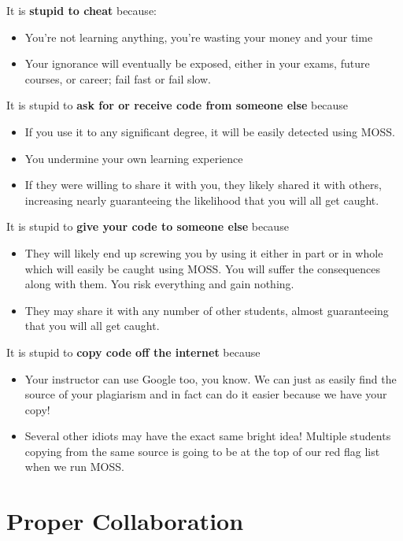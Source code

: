\documentclass[12pt]{scrartcl}
\begin{document}
It is \textbf{stupid to cheat} because:
\begin{itemize}
  \item You're not learning anything, you're wasting your money and your time
  \item Your ignorance will eventually be exposed, either in your exams, future courses, or career; fail fast or fail slow.
\end{itemize}

It is stupid to \textbf{ask for or receive code from someone else} because
\begin{itemize}
  \item If you use it to any significant degree, it will be easily detected using MOSS.
  \item You undermine your own learning experience
  \item If they were willing to share it with you, they likely shared it with others, increasing nearly guaranteeing the likelihood that you will all get caught.
\end{itemize}

It is stupid to \textbf{give your code to someone else} because
\begin{itemize}
  \item They will likely end up screwing you by using it either in part or in whole which will easily be caught using MOSS.  You will suffer the consequences along with them.  You risk everything and gain nothing.
  \item They may share it with any number of other students, almost guaranteeing that you will all get caught.
\end{itemize}

It is stupid to \textbf{copy code off the internet} because
\begin{itemize}
  \item Your instructor can use Google too, you know.  We can just as easily find the source of your plagiarism and in fact can do it easier because we have your copy!
  \item Several other idiots may have the exact same bright idea!  Multiple students copying from the same source is going to be at the top of our red flag list when we run MOSS.
\end{itemize}

\section*{Proper Collaboration}
\end{document}
